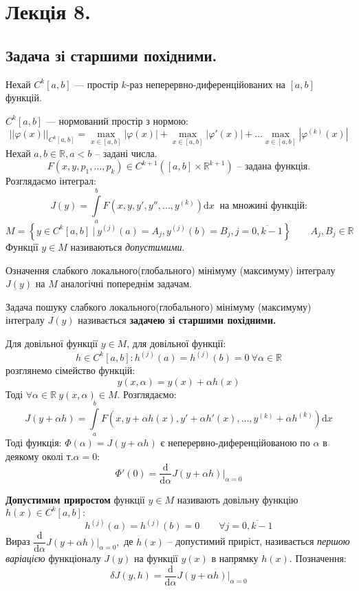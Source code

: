 \section{Лекція 8.}
\subsection{Задача зі старшими похідними.}
Нехай $C^k [a,b]$ --- простір $k$-раз неперервно-диференційованих на $[a,b]$ функцій.\par

$C^k[a,b]$ --- нормований простір з нормою:
$$
||\varphi(x)||_{C^k[a,b]} =
\max\limits_{x\in[a,b]}{ |\varphi(x)|} +
 \max\limits_{x\in[a,b]}{|\varphi'(x)|} + \dots
  \max\limits_{x\in[a,b]}{|\varphi^{(k)}(x)|}
$$
Нехай $a,b \in \mathbb{R}, a<b$ -- задані числа.
$$
F(x,y,p_1, \dots, p_k) \in C^{k+1}\left( [a,b] \times \mathbb{R}^{k+1} \right) \text{ -- задана функція.}
$$
Розглядаємо інтеграл:
$$
J(y) =  \int\limits_{a}^{ b}{
F(x, y, y' , y'', \dots , y^{(k)}) \mathrm{d} x
}\  \text{ на множині функцій:}
$$
$$
M = \left\lbrace
y\in C^{k}[a,b] \ \bigg| \  y^{(j)} (a) = A_j , y^{(j)} (b) = B_j , j=\overline{0, k-1}
 \right\rbrace \qquad A_j ,  B_j \in \mathbb{R}
$$
Функції $y \in M$ називаються \textit{допустимими}.
\begin{defo}
Означення слабкого локального(глобального) мінімуму (максимуму) інтегралу $J(y)$ на $M$ аналогічні попереднім задачам.
\end{defo}
\begin{defo}
 Задача пошуку слабкого  локального(глобального) мінімуму (максимуму) інтегралу $J(y)$ називається \textbf{задачею зі старшими похідними.}
\end{defo}
Для довільної функції $y\in M$, для довільної функції:
$$
h \in C^{k}[a,b] : h^{(j)}(a) = h^{(j)}(b) = 0 \ \forall \alpha \in \mathbb{R}
$$
розглянемо сімейство функцій:
$$
y(x, \alpha) = y(x) + \alpha h(x)
$$
Тоді $\forall \alpha \in \mathbb{R} \  y(x, \alpha) \in M$. Розглядаємо:
$$
J(y + \alpha h) =  \int\limits_{a }^{b}{F(x, y + \alpha h(x), y' + \alpha h' (x), \dots , y^{(k)} + \alpha h^{(k)}) \mathrm{d} x}
$$
Тоді функція: $\Phi (\alpha) = J(y + \alpha h)$ є неперервно-диференційованою по $\alpha$ в деякому околі т.$\alpha = 0$:
$$
\Phi'(0) = \frac{\mathrm{d}}{\mathrm{d} \alpha} J(y + \alpha h)\bigg|_{\alpha = 0}
$$
\begin{defo}
 \textbf{Допустимим приростом} функції $y\in M$ називають довільну функцію $h(x) \in C^k[a,b]:$
 $$
 h^{(j)} (a) = h^{(j)} (b) = 0 \qquad \forall j = \overline{0, k-1}
 $$
 Вираз $ \dfrac{\mathrm{d}}{\mathrm{d} \alpha} J(y + \alpha h) \bigg|_{\alpha = 0},$ де $h(x)$ -- допустимий приріст, називається \textit{першою варіацією} функціоналу $J(y)$ на функції $y(x)$ в напрямку $h(x)$.
 Позначення:
 $$
 \delta J(y, h) = \frac{\mathrm{d}}{\mathrm{d} \alpha} J (y + \alpha h) \bigg|_{\alpha = 0}
 $$

\end{defo}

